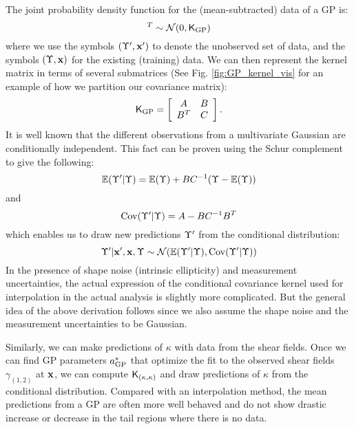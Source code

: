 The joint probability density function for the (mean-subtracted) data of a GP is:
\begin{equation}
	[\lensparams',\lensparams]^T \sim \mathcal{N}(0, \kerngp_{\rm GP})
\end{equation}
where we use the symbols $(\Upsilon', \mathbf{x}')$ to denote the unobserved set of data,
and the symbols $(\Upsilon, \mathbf{x})$ for the existing (training) data.
We can then represent the kernel matrix in terms of several submatrices 
(See Fig. \ref{fig:GP_kernel_vis} for an example of how we partition our
covariance matrix):
\begin{equation}
	\mathsf{K}_{\rm GP} = \left[\begin{array}{cc}
	A & B \\
	B^T & C 
\end{array} \right].	
\end{equation}
It is well known that the different observations from a multivariate Gaussian are 
conditionally independent. This fact can be proven using the Schur complement to give the following:
\begin{equation}
	\mathbb{E}(\Upsilon'|\Upsilon) = \mathbb{E}(\Upsilon) + BC^{-1}(\Upsilon - \mathbb{E}(\Upsilon))
\end{equation}
and
\begin{equation}
	\mathrm{Cov}(\Upsilon'|\Upsilon) = A - BC^{-1}B^T
\end{equation}
which enables us to draw new predictions $\Upsilon'$ from the conditional distribution:
\begin{equation} 
	\Upsilon' | \mathbf{x}', \mathbf{x}, \Upsilon \sim \mathcal{N}(
		\mathbb{E}(\Upsilon'| \Upsilon), \mathrm{Cov}(\Upsilon'|\Upsilon)
	)
\end{equation}
In the presence of shape noise (intrinsic ellipticity) and measurement uncertainties, the actual 
expression of the conditional covariance kernel used for interpolation in the actual analysis 
is slightly more complicated. 
But the general idea of the above derivation follows 
since we also assume the shape noise and the measurement uncertainties to be Gaussian.

Similarly, we can make predictions of $\kappa$ with data from the shear fields. 
Once we can find GP parameters $a_{\rm GP}^*$ that optimize the fit to
the observed shear fields $\gamma_{(1, 2)}$ at $\mathbf{x}$, we can compute $\mathsf{K}_{(\kappa,
\kappa)}$ and draw predictions of $\kappa$ from the conditional distribution. 
Compared with an interpolation method, the mean predictions from a GP are
often more well behaved and do not show drastic increase or decrease 
in the tail regions where there is no data. 

